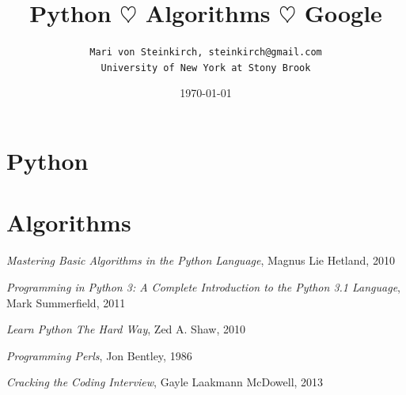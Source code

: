 \documentclass[11pt]{book}
\title{ \huge  \bfseries \textcolor{RedViolet}{ Python $\heartsuit$  Algorithms $\heartsuit$  Google}}
\author{ \fontsize{16}{25}\selectfont  \texttt{Mari von Steinkirch, steinkirch@gmail.com}\\
	      \fontsize{16}{25} \texttt{University of New York at Stony Brook}}
\date{ \today}
\begin{document}
\maketitle
{}


\tableofcontents 
\part{Python}
%
\part{Algorithms}
%
%
\printindex




\begin{thebibliography}{2}

 {\it Mastering Basic Algorithms in the Python Language}, Magnus Lie Hetland, 2010  

 {\it Programming in Python 3: A Complete Introduction to the Python 3.1 Language}, Mark Summerfield, 2011

 {\it Learn Python The Hard Way}, Zed A. Shaw, 2010

 {\it Programming Perls}, Jon Bentley, 1986

 {\it Cracking the Coding Interview}, Gayle Laakmann McDowell, 2013

\end{thebibliography}
\end{document}
